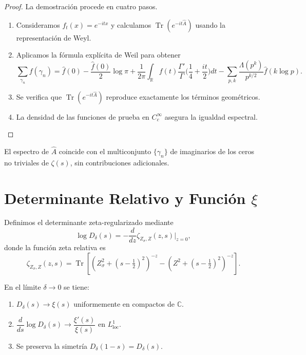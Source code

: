 \begin{proof}
La demostración procede en cuatro pasos.
\begin{enumerate}
  \item Consideramos $f_t(x) = e^{-itx}$ y calculamos $\operatorname{Tr}(e^{-it \widehat{A}})$ usando la representación de Weyl.
  \item Aplicamos la fórmula explícita de Weil para obtener
  \[
    \sum_{\gamma_n} f(\gamma_n) = \widehat{f}(0) - \frac{\widehat{f}(0)}{2}\log \pi + \frac{1}{2\pi}\int_{\mathbb{R}} f(t) \frac{\Gamma'}{\Gamma}\Big(\frac{1}{4} + \frac{it}{2}\Big) dt - \sum_{p,k} \frac{\Lambda(p^k)}{p^{k/2}}\widehat{f}(k \log p).
  \]
  \item Se verifica que $\operatorname{Tr}(e^{-it \widehat{A}})$ reproduce exactamente los términos geométricos.
  \item La densidad de las funciones de prueba en $C_c^\infty$ asegura la igualdad espectral.
\end{enumerate}
\end{proof}

\begin{corollary}\label{cor:correspondencia-espectral}
El espectro de $\widehat{A}$ coincide con el multiconjunto $\{\gamma_n\}$ de imaginarios de los ceros no triviales de $\zeta(s)$, sin contribuciones adicionales.
\end{corollary}

\section{Determinante Relativo y Función $\xi$}

Definimos el determinante zeta-regularizado mediante
\[
  \log D_\delta(s) = -\frac{d}{dz} \zeta_{Z_\sigma, Z}(z,s) \big|_{z=0},
\]
donde la función zeta relativa es
\[
  \zeta_{Z_\sigma, Z}(z,s) = \operatorname{Tr}\left[(Z_\sigma^2 + (s-\tfrac{1}{2})^2)^{-z} - (Z^2 + (s-\tfrac{1}{2})^2)^{-z}\right].
\]

\begin{theorem}\label{thm:determinante}
En el límite $\delta \to 0$ se tiene:
\begin{enumerate}
  \item $D_\delta(s) \to \xi(s)$ uniformemente en compactos de $\mathbb{C}$.
  \item $\dfrac{d}{ds} \log D_\delta(s) \to \dfrac{\xi'(s)}{\xi(s)}$ en $L^1_{\text{loc}}$.
  \item Se preserva la simetría $D_\delta(1-s) = D_\delta(s)$.
\end{enumerate}
\end{theorem}

